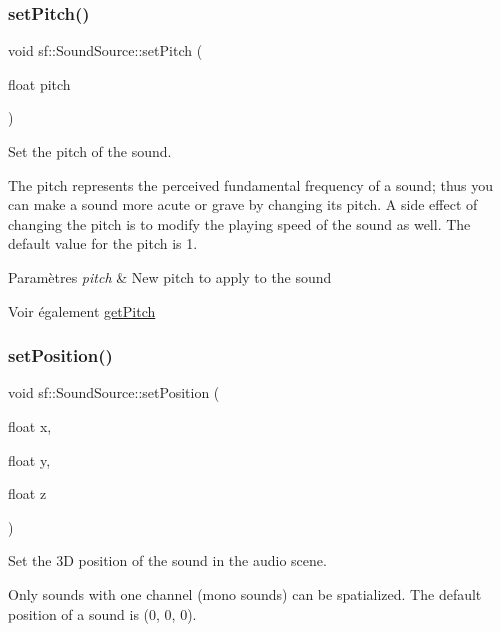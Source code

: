 \subsubsection{\texorpdfstring{set\+Pitch()}{setPitch()}}
{\footnotesize\ttfamily void sf\+::\+Sound\+Source\+::set\+Pitch (\begin{DoxyParamCaption}\item[{float}]{pitch }\end{DoxyParamCaption})}



Set the pitch of the sound. 

The pitch represents the perceived fundamental frequency of a sound; thus you can make a sound more acute or grave by changing its pitch. A side effect of changing the pitch is to modify the playing speed of the sound as well. The default value for the pitch is 1.


\begin{DoxyParams}{Paramètres}
{\em pitch} & New pitch to apply to the sound\\
\hline
\end{DoxyParams}
\begin{DoxySeeAlso}{Voir également}
\hyperlink{classsf_1_1SoundSource_a4736acc2c802f927544c9ce52a44a9e4}{get\+Pitch} 
\end{DoxySeeAlso}
\mbox{\label{classsf_1_1SoundSource_a0480257ea25d986eba6cc3c1a6f8d7c2}} 
\subsubsection{\texorpdfstring{set\+Position()}{setPosition()}\hspace{0.1cm}{\footnotesize\ttfamily [1/2]}}
{\footnotesize\ttfamily void sf\+::\+Sound\+Source\+::set\+Position (\begin{DoxyParamCaption}\item[{float}]{x,  }\item[{float}]{y,  }\item[{float}]{z }\end{DoxyParamCaption})}



Set the 3D position of the sound in the audio scene. 

Only sounds with one channel (mono sounds) can be spatialized. The default position of a sound is (0, 0, 0).


